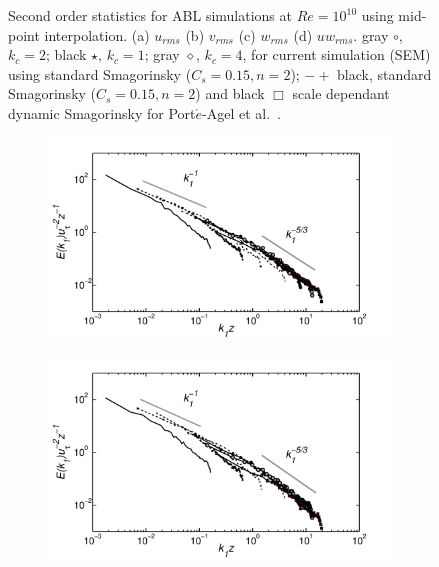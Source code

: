 \documentclass[times]{fldauth}
\begin{document}
\begin{figure}
\begin{subfigure}[t]{0.60\textwidth}
                \caption{}
                \label{fig:uwrms}
        \end{subfigure}%
        \caption{Second order statistics for ABL simulations at $Re = 10^{10}$ using mid-point interpolation. (a) $u_{rms}$ (b) $v_{rms}$ (c) $w_{rms}$ (d) $uw_{rms}$. gray $\circ$, $k_{c}=2$; black $\star$, $k_{c}=1$; gray $\diamond$, $k_{c}=4$, for current simulation (SEM) using standard Smagorinsky ($C_s = 0.15, n = 2$); $-+$ black, standard Smagorinsky ($C_s = 0.15, n = 2$) and black $\Box$ scale dependant dynamic Smagorinsky for Port$\acute{e}$-Agel et al.~\cite{porte1fun}.}\label{fig:stat2}
\end{figure}


\begin{figure}
\centering
        \begin{subfigure}[t]{0.30\textwidth}
                \includegraphics[width=\linewidth]{Figure/energy3.pdf}
                \caption{}
                \label{fig:eng1}
        \end{subfigure}%
        \centering
        \begin{subfigure}[t]{0.30\textwidth}
                \includegraphics[width=\linewidth]{Figure/energy.pdf}

\end{subfigure}
\end{figure}
\end{document}
